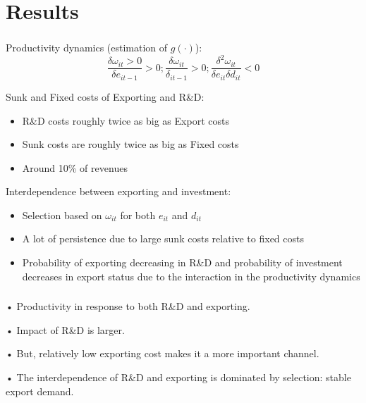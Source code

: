 \documentclass[c, dvipsnames]{beamer}  %
\begin{document}
\section{Results}




\begin{frame}[shrink=3]
\frametitle{\insertsection} 


Productivity dynamics (estimation of $g(·)$):
$$\dfrac{ \delta \omega_{it}>0}{\delta e_{it-1}} > 0; \dfrac{\delta\omega_{it}}{\delta_{it−1}}> 0; \dfrac{\delta^2\omega_{it}}{\delta e_{it}\delta d_{it}}< 0$$

Sunk and Fixed costs of Exporting and R\&D:
\begin{itemize}
	\item  R\&D costs roughly twice as big as Export costs
\item  Sunk costs are roughly twice as big as Fixed costs
\item  Around 10\% of revenues

\end{itemize}

Interdependence between exporting and investment:
\begin{itemize}
	\item  Selection based on $\omega_{it}$ for both $e_{it}$ and $d_{it}$
\item  A lot of persistence due to large sunk costs relative to fixed
costs
\item  Probability of exporting decreasing in R\&D and probability of
investment decreases in export status due to the interaction in
the productivity dynamics

\end{itemize}


\end{frame}


\begin{frame}[shrink=3]
\frametitle{\insertsection} 

• Productivity in response to both R\&D and exporting.

• Impact of R\&D is larger.

• But, relatively low exporting cost makes it a more important
channel.

• The interdependence of R\&D and exporting is dominated by
selection: stable export demand.



\end{frame}
\end{document}
